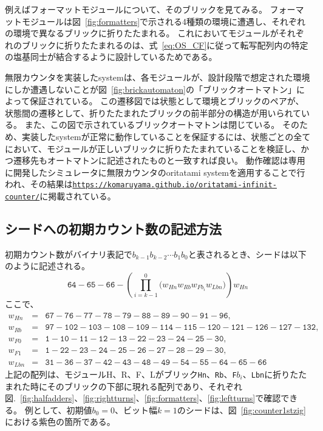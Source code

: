 \documentclass[a4j,11pt]{article}
\begin{document}
例えばフォーマットモジュールについて、そのブリックを見てみる。
フォーマットモジュールは図~\ref{fig:formatters}で示される4種類の環境に遭遇し、それぞれの環境で異なるブリックに折りたたまれる。
これにおいてモジュールがそれぞれのブリックに折りたたまれるのは、式~\eqref{eq:OS_CF}に従って転写配列内の特定の塩基同士が結合するように設計しているためである。

無限カウンタを実装したsystemは、各モジュールが、設計段階で想定された環境にしか遭遇しないことが図~\ref{fig:brickautomaton}の「ブリックオートマトン」によって保証されている。
この遷移図では状態として環境とブリックのペアが、状態間の遷移として、折りたたまれたブリックの前半部分の構造が用いられている。
また、この図で示されているブリックオートマトンは閉じている。
そのため、実装したsystemが正常に動作していることを保証するには、状態ごとの全てにおいて、モジュールが正しいブリックに折りたたまれていることを検証し、かつ遷移先もオートマトンに記述されたものと一致すれば良い。
動作確認は専用に開発したシミュレータに無限カウンタのoritatami systemを適用することで行われ、その結果は\href{https://komaruyama.github.io/oritatami-infinit-counter/}{\texttt{https://komaruyama.github.io/oritatami-infinit-counter/}}に掲載されている。

\subsection{シードへの初期カウント数の記述方法}
初期カウント数がバイナリ表記で$b_{k-1}b_{k-2} \cdots b_1b_0$と表されるとき、シードは以下のように記述される。
\begin{equation} \label{eq:zagencoding}
\texttt{64}{-}\texttt{65}{-}\texttt{66}{-}\left( \prod^0_{i = k-1} \bigl(  w_{Hn} w_{Rb} w_{Fb_i} w_{Lbn} \bigr) \right) w_{Hn}
\end{equation}
ここで、
\begin{eqnarray*}
w_{Hn} &=& \texttt{67}{-}\texttt{76}{-}\texttt{77}{-}\texttt{78}{-}\texttt{79}{-}\texttt{88}{-}\texttt{89}{-}\texttt{90}{-}\texttt{91}{-}\texttt{96},\\
w_{Rb} &=& \texttt{97}{-}\texttt{102}{-}\texttt{103}{-}\texttt{108}{-}\texttt{109}{-}\texttt{114}{-}\texttt{115}{-}\texttt{120}{-}\texttt{121}{-}\texttt{126}{-}\texttt{127}{-}\texttt{132},\\
w_{F0} &=& \texttt{1}{-}\texttt{10}{-}\texttt{11}{-}\texttt{12}{-}\texttt{13}{-}\texttt{22}{-}\texttt{23}{-}\texttt{24}{-}\texttt{25}{-}\texttt{30},\\
w_{F1} &=& \texttt{1}{-}\texttt{22}{-}\texttt{23}{-}\texttt{24}{-}\texttt{25}{-}\texttt{26}{-}\texttt{27}{-}\texttt{28}{-}\texttt{29}{-}\texttt{30},\\
 w_{Lbn} &=& \texttt{31}{-}\texttt{36}{-}\texttt{37}{-}\texttt{42}{-}\texttt{43}{-}\texttt{48}{-}\texttt{49}{-}\texttt{54}{-}\texttt{55}{-}\texttt{64}{-}\texttt{65}{-}\texttt{66}
\end{eqnarray*}
上記の配列は、モジュールH、R、F、Lがブリック\texttt{Hn}、\texttt{Rb}、\texttt{F}$b_i$、\texttt{Lbn}に折りたたまれた時にそのブリックの下部に現れる配列であり、それぞれ図.~\ref{fig:halfadders}、\ref{fig:rightturns}、\ref{fig:formatters}、\ref{fig:leftturns}で確認できる。
例として、初期値$b_0 = 0$、ビット幅$k = 1$のシードは、図~\ref{fig:counter1stzig}における紫色の箇所である。
\end{document}
